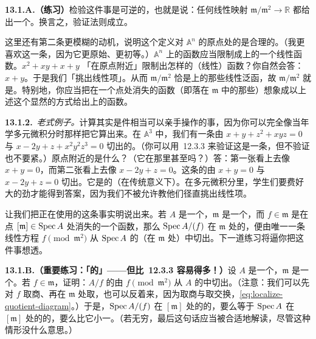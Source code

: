 \textbf{13.1.A.（练习）}\quad 检验这件事是可逆的，也就是说：任何线性映射 $\mathfrak{m}/\mathfrak{m}^2\to\mathbb{R}$ 都给出一个\trDerivation。换言之，验证\trLeibniz{}法则成立。

这里还有第二条更模糊的动机，说明这个定义对 $\mathbb{A}^n$ 的原点处的\trCotangentSpace{}是合理的。（我更喜欢这一条，因为它更原始、更初等。）$\mathbb{A}^n$ 上的函数应当限制成\trTangentSpace{}上的一个线性函数。$x^2+xy+x+y$ 「在原点附近」限制出怎样的（线性）函数？你自然会答：$x+y$。于是我们「挑出线性项」。从而 $\mathfrak{m}/\mathfrak{m}^2$ 恰是\trTangentSpace{}上的那些线性泛函，故 $\mathfrak{m}/\mathfrak{m}^2$ 就是\trCotangentSpace。特别地，你应当把在一个点处消失的函数（即落在 $\mathfrak{m}$ 中的那些）想象成以上述这个显然的方式给出\trTangentSpace{}上的函数。

\textbf{13.1.2.}\ \emph{老式例子。}\quad 计算\trZariski{}\trTangentSpace{}其实是件相当可以亲手操作的事，因为你可以完全像当年学多元微积分时那样把它算出来。在 $\mathbb{A}^3$ 中，我们有一条由 $x+y+z^2+xyz=0$ 与 $x-2y+z+x^2y^2z^3=0$ 切出的\trCurve。（你可以用\trKrull{}\trPrincipalIdealTheorem~12.3.3 来验证这是一条\trCurve，但不验证也不要紧。）原点附近的\trTangentLine{}是什么？（它在那里甚至\trSmooth{}吗？）答：第一张\trSurface{}看上去像 $x+y=0$，而第二张\trSurface{}看上去像 $x-2y+z=0$。这条\trCurve{}的\trTangentLine{}由 $x+y=0$ 与 $x-2y+z=0$ 切出。它是\trSmooth{}的（在传统意义下）。在多元微积分里，学生们要费好大的劲才能得到答案，因为我们不被允许教他们径直挑出线性项。

让我们把正在使用的这条事实明说出来。若 $A$ 是一个\trRing，$\mathfrak{m}$ 是一个\trMaximalIdeal，而 $f\in\mathfrak{m}$ 是在点 $[\mathfrak{m}]\in\operatorname{Spec} A$ 处消失的一个函数，那么 $\operatorname{Spec} A/(f)$ 在 $\mathfrak{m}$ 处的\trZariski{}\trTangentSpace，便由唯一一条线性方程 $f\pmod{\mathfrak{m}^2}$ 从 $\operatorname{Spec} A$ 的\trZariski{}\trTangentSpace（在 $\mathfrak{m}$ 处）中切出。下一道练习将逼你把这件事想透。

\textbf{13.1.B.（重要练习：「\trTangentSpace{}的\trKrull{}\trPrincipalIdealTheorem」——但比\trKrull{}\trPrincipalIdealTheorem~12.3.3 容易得多！）}\quad 设 $A$ 是一个\trRing，$\mathfrak{m}$ 是一个\trMaximalIdeal。若 $f\in\mathfrak{m}$，证明：$A/f$ 的\trZariski{}\trTangentSpace{}由 $f\pmod{\mathfrak{m}^2}$ 从 $A$ 的\trZariski{}\trTangentSpace{}中切出。（注意：我们可以先对 $f$ 取商、再在 $\mathfrak{m}$ 处取\trLocalization，也可以反着来，因为取商与取\trLocalization{}交换，\eqref{eq:localize-quotient-diagram}。）于是，$\operatorname{Spec} A/(f)$ 在 $[\mathfrak{m}]$ 处的\trZariski{}\trTangentSpace{}的\trDimension，要么等于 $\operatorname{Spec} A$ 在 $[\mathfrak{m}]$ 处的\trZariski{}\trTangentSpace{}的\trDimension，要么比它小一。（若\trDimension{}无穷，最后这句话应当被合适地解读，尽管这种情形没什么意思。）

